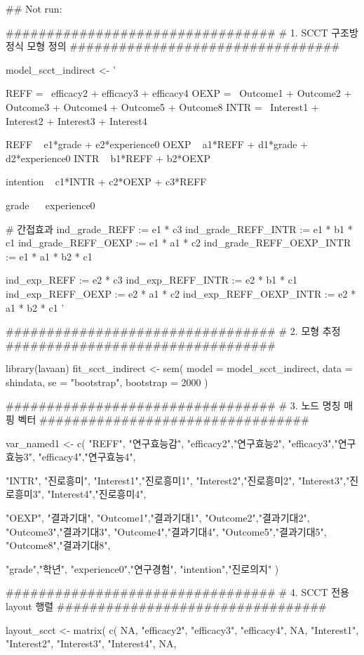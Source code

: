 \documentclass[a4paper]{book}
\begin{document}
\begin{Examples}
\begin{ExampleCode}
## Not run: 

#################################
# 1. SCCT 구조방정식 모형 정의
#################################

model_scct_indirect <- '

REFF =~ efficacy2 + efficacy3 + efficacy4
OEXP =~ Outcome1 + Outcome2 + Outcome3 + Outcome4 + Outcome5 + Outcome8
INTR =~ Interest1 + Interest2 + Interest3 + Interest4

REFF ~ e1*grade + e2*experience0
OEXP ~ a1*REFF + d1*grade + d2*experience0
INTR ~ b1*REFF + b2*OEXP

intention ~ c1*INTR + c2*OEXP + c3*REFF

grade ~~ experience0

# 간접효과
ind_grade_REFF        := e1 * c3
ind_grade_REFF_INTR   := e1 * b1 * c1
ind_grade_REFF_OEXP   := e1 * a1 * c2
ind_grade_REFF_OEXP_INTR := e1 * a1 * b2 * c1

ind_exp_REFF          := e2 * c3
ind_exp_REFF_INTR     := e2 * b1 * c1
ind_exp_REFF_OEXP     := e2 * a1 * c2
ind_exp_REFF_OEXP_INTR := e2 * a1 * b2 * c1
'

#################################
# 2. 모형 추정
#################################

library(lavaan)
fit_scct_indirect <- sem(
  model = model_scct_indirect,
  data  = shindata,
  se = "bootstrap",
  bootstrap = 2000
)

#################################
# 3. 노드 명칭 매핑 벡터
#################################

var_named1 <- c(
  "REFF", "연구효능감",
  "efficacy2","연구효능2",
  "efficacy3","연구효능3",
  "efficacy4","연구효능4",

  "INTR", "진로흥미",
  "Interest1","진로흥미1",
  "Interest2","진로흥미2",
  "Interest3","진로흥미3",
  "Interest4","진로흥미4",

  "OEXP", "결과기대",
  "Outcome1","결과기대1",
  "Outcome2","결과기대2",
  "Outcome3","결과기대3",
  "Outcome4","결과기대4",
  "Outcome5","결과기대5",
  "Outcome8","결과기대8",

  "grade","학년",
  "experience0","연구경험",
  "intention","진로의지"
)

#################################
# 4. SCCT 전용 layout 행렬
#################################

layout_scct <- matrix(
  c(
    NA, "efficacy2", "efficacy3", "efficacy4", NA,
        "Interest1", "Interest2", "Interest3", "Interest4", NA,


\end{ExampleCode}
\end{Examples}
\end{document}
